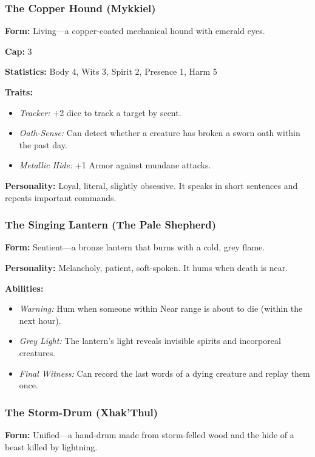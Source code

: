 \subsubsection{The Copper Hound (Mykkiel)}

\textbf{Form:} Living—a copper-coated mechanical hound with emerald eyes.

\textbf{Cap:} 3

\textbf{Statistics:} Body 4, Wits 3, Spirit 2, Presence 1, Harm 5

\textbf{Traits:}
\begin{itemize}
\item \textit{Tracker:} +2 dice to track a target by scent.
\item \textit{Oath-Sense:} Can detect whether a creature has broken a sworn oath within the past day.
\item \textit{Metallic Hide:} +1 Armor against mundane attacks.
\end{itemize}

\textbf{Personality:} Loyal, literal, slightly obsessive. It speaks in short sentences and repeats important commands.

\subsubsection{The Singing Lantern (The Pale Shepherd)}

\textbf{Form:} Sentient—a bronze lantern that burns with a cold, grey flame.

\textbf{Personality:} Melancholy, patient, soft-spoken. It hums when death is near.

\textbf{Abilities:}
\begin{itemize}
\item \textit{Warning:} Hum when someone within Near range is about to die (within the next hour).
\item \textit{Grey Light:} The lantern's light reveals invisible spirits and incorporeal creatures.
\item \textit{Final Witness:} Can record the last words of a dying creature and replay them once.
\end{itemize}

\subsubsection{The Storm-Drum (Xhak'Thul)}

\textbf{Form:} Unified—a hand-drum made from storm-felled wood and the hide of a beast killed by lightning.

